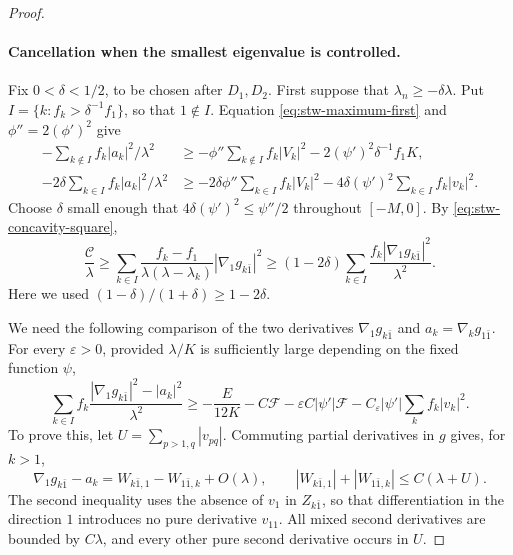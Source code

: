 \begin{proof}
\paragraph{Cancellation when the smallest eigenvalue is controlled.}
Fix $0<\delta<1/2$, to be chosen after $D_1,D_2$. First suppose that $\lambda_n\geq-\delta\lambda$. Put $I=\{k:f_k>\delta^{-1}f_1\}$, so that $1\notin I$. Equation \eqref{eq:stw-maximum-first} and $\phi''=2(\phi')^2$ give
\begin{align*}
 -\sum_{k\notin I}f_k|a_k|^2/\lambda^2
 &\geq-\phi''\sum_{k\notin I}f_k|V_k|^2
              -2(\psi')^2\delta^{-1}f_1K,\\
 -2\delta\sum_{k\in I}f_k|a_k|^2/\lambda^2
 &\geq-2\delta\phi''\sum_{k\in I}f_k|V_k|^2
              -4\delta(\psi')^2\sum_{k\in I}f_k|v_k|^2.
\end{align*}
Choose $\delta$ small enough that $4\delta(\psi')^2\leq\psi''/2$ throughout $[-M,0]$. By \eqref{eq:stw-concavity-square},
\[
 \frac{\mathcal C}{\lambda}
 \geq\sum_{k\in I}\frac{f_k-f_1}{\lambda(\lambda-\lambda_k)}
                         |\nabla_1g_{k\bar1}|^2
 \geq(1-2\delta)\sum_{k\in I}
                 \frac{f_k|\nabla_1g_{k\bar1}|^2}{\lambda^2}.
\]
Here we used $(1-\delta)/(1+\delta)\geq1-2\delta$.

We need the following comparison of the two derivatives $\nabla_1g_{k\bar1}$ and $a_k=\nabla_kg_{1\bar1}$. For every $\varepsilon>0$, provided $\lambda/K$ is sufficiently large depending on the fixed function $\psi$,
\begin{equation}\label{eq:stw-derivative-cancellation}
 \sum_{k\in I}f_k\frac{|\nabla_1g_{k\bar1}|^2-|a_k|^2}{\lambda^2}
 \geq-\frac{E}{12K}-C\mathcal F
       -\varepsilon C|\psi'|\mathcal F
       -C_\varepsilon|\psi'|\sum_k f_k|v_k|^2.
\end{equation}
To prove this, let $U=\sum_{p>1,q}|v_{pq}|$. Commuting partial derivatives in $g$ gives, for $k>1$,
\[
 \nabla_1g_{k\bar1}-a_k
       =W_{k\bar1,1}-W_{1\bar1,k}+O(\lambda),\qquad
 |W_{k\bar1,1}|+|W_{1\bar1,k}|\leq C(\lambda+U).
\]
The second inequality uses the absence of $v_1$ in $Z_{k\bar1}$, so that differentiation in the direction $1$ introduces no pure derivative $v_{11}$. All mixed second derivatives are bounded by $C\lambda$, and every other pure second derivative occurs in $U$.


\end{proof}
